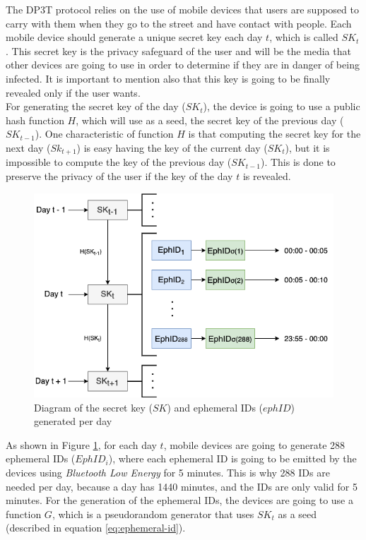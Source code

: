\documentclass[a4paper, 12pt]{article}
\begin{document}
The DP3T protocol relies on the use of mobile devices that users are supposed to carry with them when they go to the street and have contact with people. Each mobile device should generate a unique secret key each day $t$, which is called $SK_t$. This secret key is the privacy safeguard of the user and will be the media that other devices are going to use in order to determine if they are in danger of being infected. It is important to mention also that this key is going to be finally revealed only if the user wants. \\

For generating the secret key of the day ($SK_t$), the device is going to use a public hash function $H$, which will use as a seed, the secret key of the previous day ($SK_{t-1}$). One characteristic of function $H$ is that computing the secret key for the next day ($Sk_{t+1}$) is easy having the key of the current day ($SK_t$), but it is impossible to compute the key of the previous day ($SK_{t-1}$). This is done to preserve the privacy of the user if the key of the day $t$ is revealed. \\

\begin{figure}[h]
    \centering
    \includegraphics[scale=0.4]{images/discussion/SK-ids-diagram.png}
    \caption{Diagram of the secret key ($SK$) and ephemeral IDs ($ephID$) generated per day}
    \label{fig:sk-diagram}
\end{figure}

As shown in Figure \ref{fig:sk-diagram}, for each day $t$, mobile devices are going to generate 288 ephemeral IDs ($EphID_i$), where each ephemeral ID is going to be emitted by the devices using \textit{Bluetooth Low Energy} for 5 minutes. This is why 288 IDs are needed per day, because a day has 1440 minutes, and the IDs are only valid for 5 minutes. For the generation of the ephemeral IDs, the devices are going to use a function $G$, which is a pseudorandom generator that uses $SK_t$ as a seed (described in equation \ref{eq:ephemeral-id}).
\end{document}
